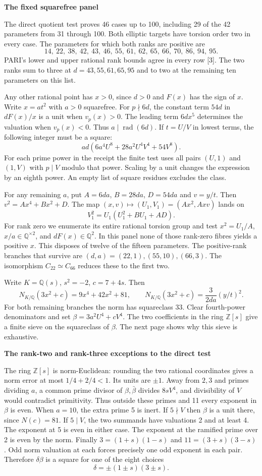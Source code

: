 \documentclass[12pt]{article}
\newcommand{\Q}{\mathbb Q}\newcommand{\Z}{\mathbb Z}
\newcommand{\heading}[1]{{\Large\bfseries\color{ink}#1}\par\vspace{3pt}}
\newcommand{\sub}[1]{\par\smallskip{\bfseries\color{green}#1}\par}
\begin{document}
\newpage
\heading{The fixed squarefree panel}
The direct quotient test proves 46 cases up to 100, including 29 of the 42 parameters from 31 through 100. Both elliptic targets have torsion order two in every case. The parameters for which both ranks are positive are
\[
14,\ 22,\ 38,\ 42,\ 43,\ 46,\ 55,\ 61,\ 62,\ 65,\ 66,\ 70,\ 86,\ 94,\ 95.
\]
PARI's lower and upper rational rank bounds agree in every row [3]. The two ranks sum to three at $d=43,55,61,65,95$ and to two at the remaining ten parameters on this list.

\sub{Rational squareclasses}
Any other rational point has $x>0$, since $d>0$ and $F(x)$ has the sign of $x$. Write $x=a t^2$ with $a>0$ squarefree. For $p\nmid 6d$, the constant term $54d$ in $dF(x)/x$ is a unit when $v_p(x)>0$. The leading term $6dx^5$ determines the valuation when $v_p(x)<0$. Thus $a\mid\operatorname{rad}(6d)$. If $t=U/V$ in lowest terms, the following integer must be a square:
\[
 ad\left(6a^4U^8+28a^2U^4V^4+54V^8\right).
\]
For each prime power in the receipt the finite test uses all pairs $(U,1)$ and $(1,V)$ with $p\mid V$ modulo that power. Scaling by a unit changes the expression by an eighth power. An empty list of square residues excludes the class.

For any remaining $a$, put $A=6da$, $B=28da$, $D=54da$ and $v=y/t$. Then $v^2=Ax^4+Bx^2+D$. The map $(x,v)\mapsto(U_1,V_1)=(Ax^2,Axv)$ lands on
\[
 V_1^2=U_1(U_1^2+B U_1+AD).
\]
For rank zero we enumerate its entire rational torsion group and test $x^2=U_1/A$, $x/a\in\Q^{\times2}$, and $dF(x)\in\Q^2$. In this panel none of those rank-zero fibres yields a positive $x$. This disposes of twelve of the fifteen parameters. The positive-rank branches that survive are $(d,a)=(22,1),(55,10),(66,3)$. The isomorphism $C_{22}\simeq C_{66}$ reduces these to the first two.

\sub{A quadratic factorization}
Write $K=\Q(s)$, $s^2=-2$, $c=7+4s$. Then
\[
 N_{K/\Q}(3x^2+c)=9x^4+42x^2+81,\qquad
 N_{K/\Q}(3x^2+c)=\frac{3}{2da}(y/t)^2 .
\]
For both remaining branches the norm has squareclass $33$. Clear fourth-power denominators and set $\beta=3a^2 U^4+cV^4$. The two coefficients in the ring $\Z[s]$ give a finite sieve on the squareclass of $\beta$. The next page shows why this sieve is exhaustive.

\newpage
\heading{The rank-two and rank-three exceptions to the direct test}
The ring $\Z[s]$ is norm-Euclidean: rounding the two rational coordinates gives a norm error at most $1/4+2/4<1$. Its units are $\pm1$. Away from $2,3$ and primes dividing $a$, a common prime divisor of $\beta,\bar\beta$ divides $8sV^4$, and divisibility of $V$ would contradict primitivity. Thus outside these primes and 11 every exponent in $\beta$ is even. When $a=10$, the extra prime 5 is inert. If $5\nmid V$ then $\beta$ is a unit there, since $N(c)=81$. If $5\mid V$, the two summands have valuations 2 and at least 4. The exponent at 5 is even in either case. The exponent at the ramified prime over 2 is even by the norm. Finally $3=(1+s)(1-s)$ and $11=(3+s)(3-s)$. Odd norm valuation at each forces precisely one odd exponent in each pair. Therefore $\delta\beta$ is a square for one of the eight choices
\[
 \delta=\pm(1\pm s)(3\pm s).
\]
\end{document}
